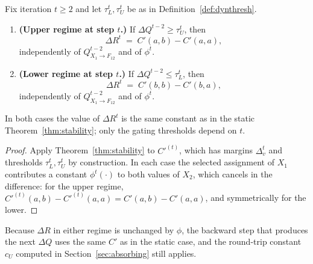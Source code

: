 \begin{theorem}\label{thm:dynstability}
Fix iteration $t \geq 2$ and let $\tau_L^t, \tau_U^t$ be as in Definition~\ref{def:dynthresh}.
\begin{enumerate}
    \item \textbf{(Upper regime at step $t$.)} If $\Delta Q^{t-2} \geq \tau_U^t$, then
    \[
        \Delta R^t \;=\; C'(a,b) - C'(a,a),
    \]
    independently of $Q^{t-2}_{X_1 \to F_{12}}$ and of $\phi^t$.
    \item \textbf{(Lower regime at step $t$.)} If $\Delta Q^{t-2} \leq \tau_L^t$, then
    \[
        \Delta R^t \;=\; C'(b,b) - C'(b,a),
    \]
    independently of $Q^{t-2}_{X_1 \to F_{12}}$ and of $\phi^t$.
\end{enumerate}
In both cases the value of $\Delta R^t$ is the same constant as in the static Theorem~\ref{thm:stability}; only the gating thresholds depend on $t$.
\end{theorem}
\begin{proof}
Apply Theorem~\ref{thm:stability} to $C'^{(t)}$, which has margins $\Delta^t_v$ and thresholds $\tau_L^t, \tau_U^t$ by construction.  In each case the selected assignment of $X_1$ contributes a constant $\phi^t(\cdot)$ to both values of $X_2$, which cancels in the difference: for the upper regime, $C'^{(t)}(a,b) - C'^{(t)}(a,a) = C'(a,b) - C'(a,a)$, and symmetrically for the lower. \qedhere
\end{proof}
Because $\Delta R$ in either regime is unchanged by $\phi$, the backward step that produces the next $\Delta Q$ uses the same $C'$ as in the static case, and the round-trip constant $c_U$ computed in Section~\ref{sec:absorbing} still applies.
